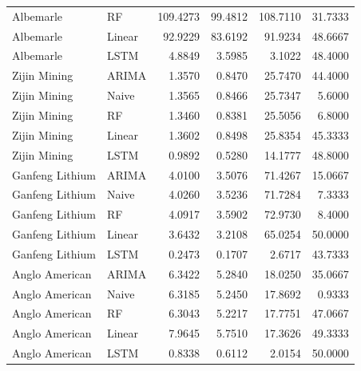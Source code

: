 \begin{longtable}{llrrrr}
Albemarle & RF & 109.4273 & 99.4812 & 108.7110 & 31.7333 \\
Albemarle & Linear & 92.9229 & 83.6192 & 91.9234 & 48.6667 \\
Albemarle & LSTM & 4.8849 & 3.5985 & 3.1022 & 48.4000 \\
Zijin Mining & ARIMA & 1.3570 & 0.8470 & 25.7470 & 44.4000 \\
Zijin Mining & Naive & 1.3565 & 0.8466 & 25.7347 & 5.6000 \\
Zijin Mining & RF & 1.3460 & 0.8381 & 25.5056 & 6.8000 \\
Zijin Mining & Linear & 1.3602 & 0.8498 & 25.8354 & 45.3333 \\
Zijin Mining & LSTM & 0.9892 & 0.5280 & 14.1777 & 48.8000 \\
Ganfeng Lithium & ARIMA & 4.0100 & 3.5076 & 71.4267 & 15.0667 \\
Ganfeng Lithium & Naive & 4.0260 & 3.5236 & 71.7284 & 7.3333 \\
Ganfeng Lithium & RF & 4.0917 & 3.5902 & 72.9730 & 8.4000 \\
Ganfeng Lithium & Linear & 3.6432 & 3.2108 & 65.0254 & 50.0000 \\
Ganfeng Lithium & LSTM & 0.2473 & 0.1707 & 2.6717 & 43.7333 \\
Anglo American & ARIMA & 6.3422 & 5.2840 & 18.0250 & 35.0667 \\
Anglo American & Naive & 6.3185 & 5.2450 & 17.8692 & 0.9333 \\
Anglo American & RF & 6.3043 & 5.2217 & 17.7751 & 47.0667 \\
Anglo American & Linear & 7.9645 & 5.7510 & 17.3626 & 49.3333 \\
Anglo American & LSTM & 0.8338 & 0.6112 & 2.0154 & 50.0000 \\
\end{longtable}

